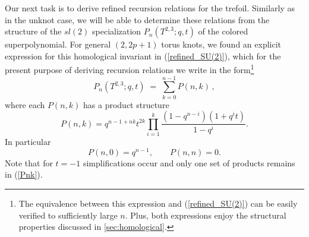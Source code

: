 \documentclass[hyper,letterpaper]{JHEP3}
\newcommand{\be}{\begin{equation}}
\newcommand{\ee}{\end{equation}}
\begin{document}
Our next task is to derive refined recursion relations for the trefoil.
Similarly as in the unknot case, we will be able to determine these relations from
the structure of the $sl(2)$ specialization $P_{n}(T^{2,3};q,t)$ of the colored superpolynomial.
For general $(2,2p+1)$ torus knots, we found an explicit expression for
this homological invariant in (\ref{refined_SU(2)}), which for the present purpose
of deriving recursion relations we write in the form\footnote{The equivalence
between this expression and (\ref{refined_SU(2)}) can be easily verified to sufficiently large $n$.
Plus, both expressions enjoy the structural properties discussed in \ref{sec:homological}.}
\be
P_{n}(T^{2,3}; q,t) \; = \; \sum_{k=0}^{n-1} P(n,k) \,,    \label{Pn-single}
\ee
where each $P(n,k)$ has a product structure
\be
P(n,k) = q^{n-1+n k} t^{2k} \prod_{i=1}^k \frac{(1 - q^{n-i})(1 + q^i t)}{1 - q^i}.  \label{Pnk}
\ee
In particular
\be
P(n,0) = q^{n-1}, \qquad P(n,n) = 0.
\ee
Note that for $t=-1$ simplifications occur and only one set of products remains in (\ref{Pnk}).
\end{document}
